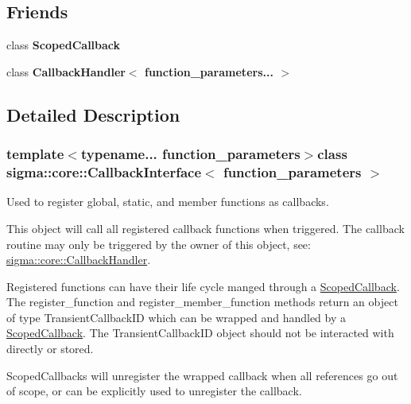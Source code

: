 \subsection*{Friends}
\begin{DoxyCompactItemize}
\item 
\hypertarget{classsigma_1_1core_1_1_callback_interface_a3414685dbc2eaa79d5e5af6729f74c0f}{}class {\bfseries Scoped\+Callback}\label{classsigma_1_1core_1_1_callback_interface_a3414685dbc2eaa79d5e5af6729f74c0f}

\item 
\hypertarget{classsigma_1_1core_1_1_callback_interface_aa40ef6fe1ae370543551561772e9d468}{}class {\bfseries Callback\+Handler$<$ function\+\_\+parameters... $>$}\label{classsigma_1_1core_1_1_callback_interface_aa40ef6fe1ae370543551561772e9d468}

\end{DoxyCompactItemize}


\subsection{Detailed Description}
\subsubsection*{template$<$typename... function\+\_\+parameters$>$class sigma\+::core\+::\+Callback\+Interface$<$ function\+\_\+parameters $>$}

Used to register global, static, and member functions as callbacks. 

This object will call all registered callback functions when triggered. The callback routine may only be triggered by the owner of this object, see\+: \hyperlink{classsigma_1_1core_1_1_callback_handler}{sigma\+::core\+::\+Callback\+Handler}.

Registered functions can have their life cycle manged through a \hyperlink{classsigma_1_1core_1_1_scoped_callback}{Scoped\+Callback}. The {\ttfamily register\+\_\+function} and {\ttfamily register\+\_\+member\+\_\+function} methods return an object of type Transient\+Callback\+I\+D which can be wrapped and handled by a \hyperlink{classsigma_1_1core_1_1_scoped_callback}{Scoped\+Callback}. The Transient\+Callback\+I\+D object should not be interacted with directly or stored.

Scoped\+Callbacks will unregister the wrapped callback when all references go out of scope, or can be explicitly used to unregister the callback.

